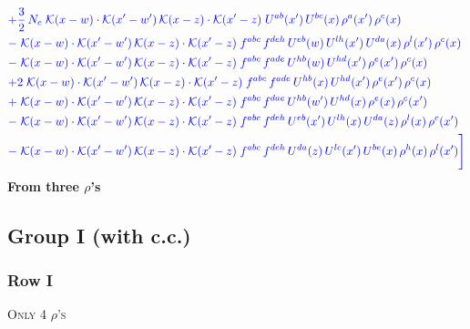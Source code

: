 \documentclass[9pt]{article}
\numberwithin{equation}{section}
\begin{document}
\begin{align}
&{\color{blue}+\frac{3}{2}\,N_c\;\mathcal{K}(x-w)\cdot\mathcal{K}(x'-w')\,\mathcal{K}(x-z)\cdot\mathcal{K}(x'-z)\;U^{ab}(x')\,U^{bc}(x)\,\rho^{a}(x')\,\rho^{c}(x)}\notag\\
&{\color{blue}-\;\mathcal{K}(x-w)\cdot\mathcal{K}(x'-w')\,\mathcal{K}(x-z)\cdot\mathcal{K}(x'-z)\;f^{abc}\,f^{deh}\,U^{eb}(w)\,U^{lh}(x')\,U^{da}(x)\,\rho^{l}(x')\,\rho^{c}(x)}\notag\\
&{\color{blue}-\;\mathcal{K}(x-w)\cdot\mathcal{K}(x'-w')\,\mathcal{K}(x-z)\cdot\mathcal{K}(x'-z)\;f^{abc}\,f^{ade}\,U^{hb}(w)\,U^{hd}(x')\,\rho^{e}(x')\,\rho^{c}(x)}\notag\\
&{\color{blue}+2\;\mathcal{K}(x-w)\cdot\mathcal{K}(x'-w')\,\mathcal{K}(x-z)\cdot\mathcal{K}(x'-z)\;f^{abc}\,f^{ade}\,U^{hb}(x)\,U^{hd}(x')\,\rho^{e}(x')\,\rho^{c}(x)}\notag\\
&{\color{blue}+\;\mathcal{K}(x-w)\cdot\mathcal{K}(x'-w')\,\mathcal{K}(x-z)\cdot\mathcal{K}(x'-z)\;f^{abc}\,f^{dae}\,U^{hb}(w')\,U^{hd}(x)\,\rho^{e}(x)\,\rho^{c}(x')}\notag\\
&{\color{blue}-\;\mathcal{K}(x-w)\cdot\mathcal{K}(x'-w')\,\mathcal{K}(x-z)\cdot\mathcal{K}(x'-z)\;f^{abc}\,f^{deh}\,U^{eb}(x')\,U^{lh}(x)\,U^{da}(z)\,\rho^{l}(x)\,\rho^{c}(x')}\notag\\
&{\color{blue}-\;\mathcal{K}(x-w)\cdot\mathcal{K}(x'-w')\,\mathcal{K}(x-z)\cdot\mathcal{K}(x'-z)\;f^{abc}\,f^{deh}\,U^{da}(z)\,U^{lc}(x')\,U^{be}(x)\,\rho^{h}(x)\,\rho^{l}(x')}{\color{blue}\Bigg]}
\end{align}
\textbf{From three $\rho$'s}
\subsection{Group I (with c.c.)}
\subsubsection{Row I}
\textsc{Only 4 $\rho$'s}
\end{document}
